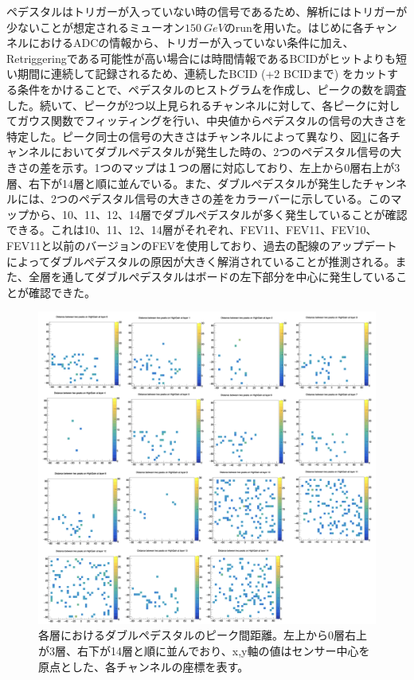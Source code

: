 ペデスタルはトリガーが入っていない時の信号であるため、解析にはトリガーが少ないことが想定されるミューオン$\SI{150}{GeV}$のrunを用いた。はじめに各チャンネルにおけるADCの情報から、トリガーが入っていない条件に加え、Retriggeringである可能性が高い場合には時間情報であるBCIDがヒットよりも短い期間に連続して記録されるため、連続したBCID (+2 BCIDまで) をカットする条件をかけることで、ペデスタルのヒストグラムを作成し、ピークの数を調査した。続いて、ピークが2つ以上見られるチャンネルに対して、各ピークに対してガウス関数でフィッティングを行い、中央値からペデスタルの信号の大きさを特定した。ピーク同士の信号の大きさはチャンネルによって異なり、図\ref{dpmap}に各チャンネルにおいてダブルペデスタルが発生した時の、2つのペデスタル信号の大きさの差を示す。1つのマップは１つの層に対応しており、左上から0層右上が3層、右下が14層と順に並んでいる。また、ダブルぺデスタルが発生したチャンネルには、2つのペデスタル信号の大きさの差をカラーバーに示している。このマップから、10、11、12、14層でダブルぺデスタルが多く発生していることが確認できる。これは10、11、12、14層がそれぞれ、FEV11、FEV11、FEV10、FEV11と以前のバージョンのFEVを使用しており、過去の配線のアップデートによってダブルぺデスタルの原因が大きく解消されていることが推測される。また、全層を通してダブルぺデスタルはボードの左下部分を中心に発生していることが確認できた。

\begin{figure}[H]
\begin{center}
 \includegraphics[keepaspectratio, scale=0.45]
 	{Figure/Beamtest/dpmap.png}
 		\caption[各層におけるダブルペデスタルのピーク間距離]{各層におけるダブルペデスタルのピーク間距離。左上から0層右上が3層、右下が14層と順に並んでおり、x,y軸の値はセンサー中心を原点とした、各チャンネルの座標を表す。}
		\label{dpmap}
\end{center}
\end{figure}


